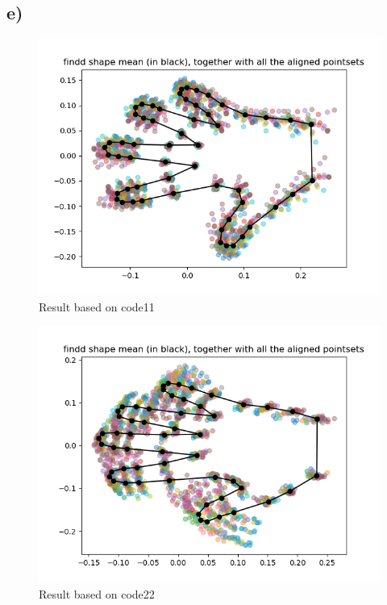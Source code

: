 \documentclass{article}
\begin{document}
\newpage
\thispagestyle{fancy}

\subsection{e)}
\begin{figure}[H]
    \centerline{\includegraphics[scale=0.5]{../results/hand/mean-and-aligned-data.png}}
    \caption{Result based on code11}
\end{figure}

\begin{figure}[H]
    \centerline{\includegraphics[scale=0.5]{../results/hand/mean-and-aligned-data2.png}}
    \caption{Result based on code22}
\end{figure}
\end{document}
